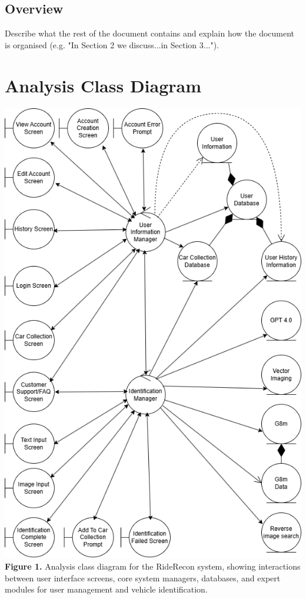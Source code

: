 \documentclass[]{article}
\begin{document}

\subsection{Overview}
\label{sub:overview}
Describe what the rest of the document contains and explain how the document is organised (e.g. "In Section 2 we discuss...in Section 3...").



\section{Analysis Class Diagram}
\label{sec:analysis_class_diagram}
\begin{center}
	\includegraphics[scale=0.5]{images/AnalysisDiagram_compacted.png}\\
	\textbf{Figure 1.} Analysis class diagram for the RideRecon system, showing interactions between user interface screens, core system managers, databases, and expert modules for user management and vehicle identification.
\end{center}
\end{document}
